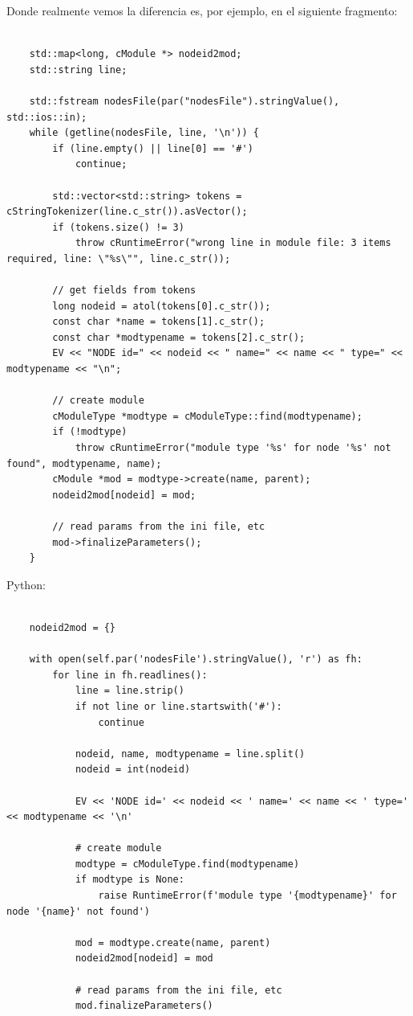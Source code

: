 \documentclass[]{article}
\begin{document}
Donde realmente vemos la diferencia es, por ejemplo, en el siguiente fragmento:

\begin{verbatim}

    std::map<long, cModule *> nodeid2mod;
    std::string line;

    std::fstream nodesFile(par("nodesFile").stringValue(), std::ios::in);
    while (getline(nodesFile, line, '\n')) {
        if (line.empty() || line[0] == '#')
            continue;

        std::vector<std::string> tokens = cStringTokenizer(line.c_str()).asVector();
        if (tokens.size() != 3)
            throw cRuntimeError("wrong line in module file: 3 items required, line: \"%s\"", line.c_str());

        // get fields from tokens
        long nodeid = atol(tokens[0].c_str());
        const char *name = tokens[1].c_str();
        const char *modtypename = tokens[2].c_str();
        EV << "NODE id=" << nodeid << " name=" << name << " type=" << modtypename << "\n";

        // create module
        cModuleType *modtype = cModuleType::find(modtypename);
        if (!modtype)
            throw cRuntimeError("module type '%s' for node '%s' not found", modtypename, name);
        cModule *mod = modtype->create(name, parent);
        nodeid2mod[nodeid] = mod;

        // read params from the ini file, etc
        mod->finalizeParameters();
    }
\end{verbatim}

Python:

\begin{verbatim}

    nodeid2mod = {}

    with open(self.par('nodesFile').stringValue(), 'r') as fh:
        for line in fh.readlines():
            line = line.strip()
            if not line or line.startswith('#'):
                continue

            nodeid, name, modtypename = line.split()
            nodeid = int(nodeid)

            EV << 'NODE id=' << nodeid << ' name=' << name << ' type=' << modtypename << '\n'

            # create module
            modtype = cModuleType.find(modtypename)
            if modtype is None:
                raise RuntimeError(f'module type '{modtypename}' for node '{name}' not found')

            mod = modtype.create(name, parent)
            nodeid2mod[nodeid] = mod

            # read params from the ini file, etc
            mod.finalizeParameters()

\end{verbatim}
\end{document}
